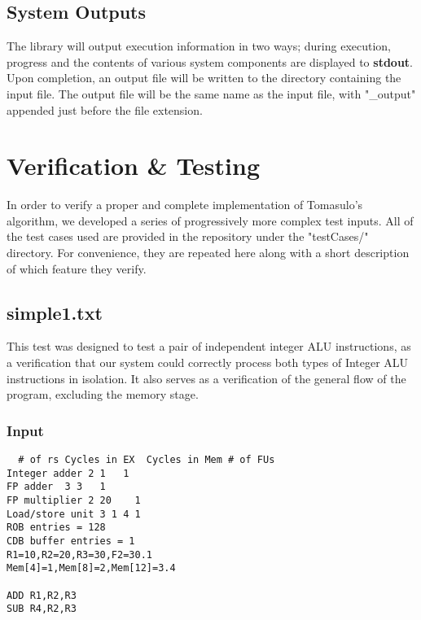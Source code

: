 \documentclass[12pt]{article}
\begin{document}
\subsection{System Outputs}
The library will output execution information in two ways; during execution, progress and the contents of various system components are displayed to \textbf{stdout}.  Upon completion, an output file will be written to the directory containing the input file.  The output file will be the same name as the input file, with "\_output" appended just before the file extension.

\section{Verification \& Testing}
In order to verify a proper and complete implementation of Tomasulo's algorithm, we developed a series of progressively more complex test inputs.  All of the test cases used are provided in the repository under the "testCases/" directory.  For convenience, they are repeated here along with a short description of which feature they verify.

\subsection{simple1.txt}
This test was designed to test a pair of independent integer ALU instructions, as a verification that our system could correctly process both types of Integer ALU instructions in isolation.  It also serves as a verification of the general flow of the program, excluding the memory stage.

\subsubsection*{Input}
\begin{verbatim}
  # of rs Cycles in EX  Cycles in Mem # of FUs
Integer adder 2 1   1
FP adder  3 3   1
FP multiplier 2 20    1
Load/store unit 3 1 4 1
ROB entries = 128
CDB buffer entries = 1
R1=10,R2=20,R3=30,F2=30.1
Mem[4]=1,Mem[8]=2,Mem[12]=3.4

ADD R1,R2,R3
SUB R4,R2,R3
\end{verbatim}
\end{document}
